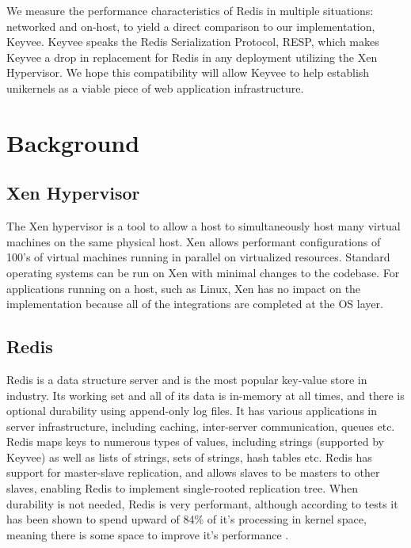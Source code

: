 \documentclass[english,10pt,twocolumn]{article}
\begin{document}
We measure the performance characteristics of Redis in multiple situations: networked and on-host, to yield a direct comparison to our implementation, Keyvee.
Keyvee speaks the Redis Serialization Protocol\cite{redis-protocol}, RESP, which makes Keyvee a drop in replacement for Redis in any deployment utilizing the Xen Hypervisor.
We hope this compatibility will allow Keyvee to help establish unikernels as a viable piece of web application infrastructure.


\section{Background}



\subsection{Xen Hypervisor}

The Xen hypervisor is a tool to allow a host to simultaneously host many virtual machines on the same physical host.
Xen allows performant configurations of 100's of virtual machines running in parallel on virtualized resources.
Standard operating systems can be run on Xen with minimal changes to the codebase.
For applications running on a host, such as Linux, Xen has no impact on the implementation because all of the integrations are completed at the OS layer.


\subsection{Redis}

Redis is a data structure server and is the most popular key-value store in industry\cite{dbengines}.
Its working set and all of its data is in-memory at all times, and there is optional durability using append-only log files.
It has various applications in server infrastructure, including caching, inter-server communication, queues etc.
Redis maps keys to numerous types of values, including strings (supported by Keyvee) as well as lists of strings, sets of strings, hash tables etc.
Redis has support for master-slave replication, and allows slaves to be masters to other slaves, enabling Redis to implement single-rooted replication tree.
When durability is not needed, Redis is very performant, although according to tests it has been shown to spend upward of 84\% of it's processing in kernel space, meaning there is some space to improve it's performance \cite{latency}.
\end{document}
